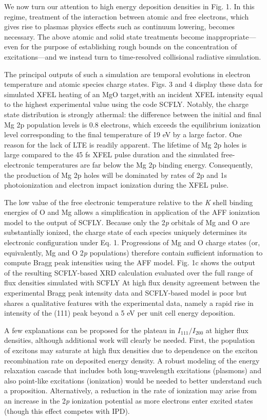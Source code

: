We now turn our attention to high energy deposition densities in Fig. 1.
In this regime, treatment of the interaction between atomic and free
electrons, which gives rise to plasmas physics effects such as continuum
lowering, becomes necessary. The above atomic and solid state treatments
become inappropriate---even for the purpose of establishing rough bounds
on the concentration of excitations---and we instead turn to
time-resolved collisional radiative simulation.

The principal outputs of such a simulation are temporal evolutions in
electron temperature and atomic species charge states. Figs. 3 and 4
display these data for simulated XFEL heating of an MgO target,with an
incident XFEL intensity equal to the highest experimental value using
the code SCFLY. Notably, the charge state distribution is strongly
athermal: the difference between the initial and final Mg 2p population
levels is 0.8 electrons, which exceeds the equilibrium ionization level
corresponding to the final temperature of 19 eV by a large factor. One
reason for the lack of LTE is readily apparent. The lifetime of Mg 2p
holes is large compared to the 45 fs XFEL pulse duration \cite{keski1974total, fuggle1992unoccupied} and
the simulated free-electronic temperatures are far below the Mg 2p
binding energy. Consequently, the production of Mg 2p holes will be
dominated by rates of 2p and 1s photoionization and electron impact
ionization during the XFEL pulse.

The low value of the free electronic temperature relative to the
\emph{K} shell binding energies of O and Mg allows a simplification in
application of the AFF ionization model to the output of SCFLY. Because
only the 2\emph{p} orbitals of Mg and O are substantially ionized, the
charge state of each species uniquely determines its electronic
configuration under Eq. 1. Progressions of Mg and O charge states (or,
equivalently, Mg and O 2\emph{p} populations) therefore contain
sufficient information to compute Bragg peak intensities using the AFF
model. Fig. 1c shows the output of the resulting SCFLY-based XRD
calculation evaluated over the full range of flux densities simulated
with SCFLY At high flux density agreement between the experimental Bragg
peak intensity data and SCFLY-based model is poor but shares a
qualitative features with the experimental data, namely a rapid rise in
intensity of the (111) peak beyond a 5 eV per unit cell energy
deposition.

A few explanations can be proposed for the plateau in
\(I_{111}/I_{200}\) at higher flux densities, although additional work
will clearly be needed. First, the population of excitons may saturate
at high flux densities due to dependence on the exciton recombination
rate on deposited energy density. A robust modeling of the energy
relaxation cascade that includes both long-wavelength excitations
(plasmons) and also point-like excitations (ionization) would be needed
to better understand such a proposition. Alternatively, a reduction in
the rate of ionization may arise from an increase in the 2\emph{p}
ionization potential as more electrons enter excited states (though this
effect competes with IPD).

